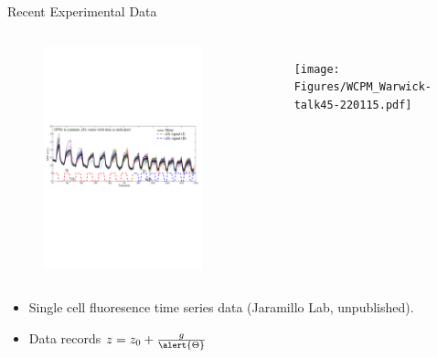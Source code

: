 \documentclass{beamer}
\begin{document}
\begin{frame}{Recent Experimental Data}{}
\begin{columns}
\begin{figure}
   \includegraphics[trim = 10 300 270 290,clip = true,scale = 0.55]{Figures/13_9}
\end{figure}
\vspace{-5mm}
\begin{figure}
   \texttt{[image: Figures/WCPM\_Warwick-talk45-220115.pdf]}
\end{figure}
\end{columns}
  \begin{itemize}
    \item Single cell fluoresence time series data (Jaramillo Lab, unpublished).
    \item  Data records $z= z_{0} +\frac{g}{\alert{\Theta}} $
    \end{itemize}
\end{frame}
\end{document}
